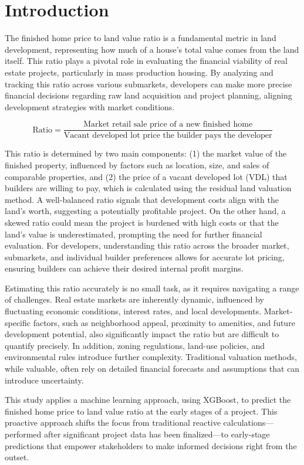 \section{Introduction}

The finished home price to land value ratio is a fundamental metric in land development,
representing how much of a house's total value comes from the land itself. This ratio
plays a pivotal role in evaluating the financial viability of real estate projects,
particularly in mass production housing. By analyzing and tracking this ratio across
various submarkets, developers can make more precise financial decisions
regarding raw land acquisition and project planning, aligning development strategies
with market conditions.

\[
	\text{Ratio}= \frac{ \text{Market retail sale price of a new finished home} }{
	\text{Vacant developed lot price the builder pays the developer} }
\]

This ratio is determined by two main components: (1) the market value of the finished
property, influenced by factors such as location, size, and sales of comparable
properties, and (2) the price of a vacant developed lot (VDL) that builders are willing
to pay, which is calculated using the residual land valuation method. A well-balanced
ratio signals that development costs align with the land’s worth, suggesting a
potentially profitable project. On the other hand, a skewed ratio could mean the
project is burdened with high costs or that the land’s value is underestimated, prompting
the need for further financial evaluation. For developers, understanding this ratio
across the broader market, submarkets, and individual builder preferences allows
for accurate lot pricing, ensuring builders can achieve their desired internal
profit margins.

Estimating this ratio accurately is no small task, as it requires navigating a range
of challenges. Real estate markets are inherently dynamic, influenced by fluctuating
economic conditions, interest rates, and local developments. Market-specific
factors, such as neighborhood appeal, proximity to amenities, and future development
potential, also significantly impact the ratio but are difficult to quantify
precisely. In addition, zoning regulations, land-use policies, and environmental
rules introduce further complexity. Traditional valuation methods, while
valuable, often rely on detailed financial forecasts and assumptions that can introduce
uncertainty.

This study applies a machine learning approach, using XGBoost, to predict the finished
home price to land value ratio at the early stages of a project. This proactive
approach shifts the focus from traditional reactive calculations—performed after
significant project data has been finalized—to early-stage predictions that
empower stakeholders to make informed decisions right from the outset.

